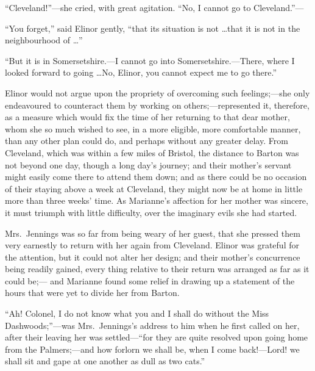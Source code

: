 ``Cleveland!''---she cried, with great agitation.
``No, I cannot go to Cleveland.''---%

``You forget,'' said Elinor gently, ``that its situation
is not \ldots that it is not in the neighbourhood of \ldots''

``But it is in Somersetshire.---I cannot go
into Somersetshire.---There, where I looked forward
to going \ldots No, Elinor, you cannot expect me to go there.''

Elinor would not argue upon the propriety of overcoming
such feelings;---she only endeavoured to counteract them by
working on others;---represented it, therefore, as a measure
which would fix the time of her returning to that dear mother,
whom she so much wished to see, in a more eligible,
more comfortable manner, than any other plan could do,
and perhaps without any greater delay.  From Cleveland,
which was within a few miles of Bristol, the distance to
Barton was not beyond one day, though a long day's journey;
and their mother's servant might easily come there to attend
them down; and as there could be no occasion of their
staying above a week at Cleveland, they might now be at
home in little more than three weeks' time.  As Marianne's
affection for her mother was sincere, it must triumph
with little difficulty, over the imaginary evils she had started.

Mrs.\ Jennings was so far from being weary of her guest,
that she pressed them very earnestly to return with her again
from Cleveland.  Elinor was grateful for the attention,
but it could not alter her design; and their mother's
concurrence being readily gained, every thing relative
to their return was arranged as far as it could be;---%
and Marianne found some relief in drawing up a statement
of the hours that were yet to divide her from Barton.

``Ah! Colonel, I do not know what you and I shall
do without the Miss Dashwoods;''---was Mrs.\ Jennings's
address to him when he first called on her, after their
leaving her was settled---``for they are quite resolved
upon going home from the Palmers;---and how forlorn we
shall be, when I come back!---Lord! we shall sit and gape
at one another as dull as two cats.''

